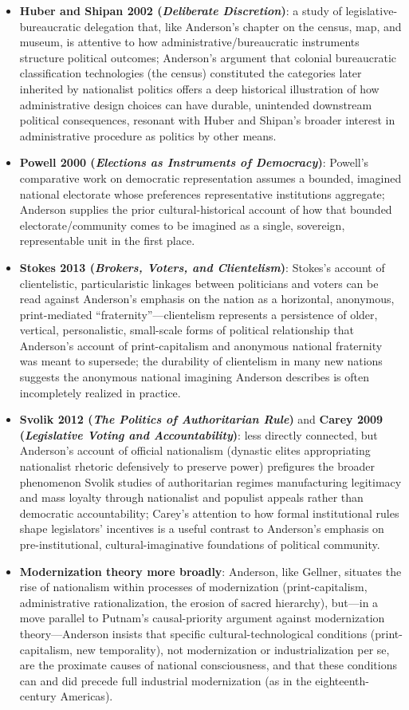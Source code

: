 \documentclass[12pt]{article}
\begin{document}
\begin{itemize}[leftmargin=*, itemsep=4pt]
    \item \textbf{Huber and Shipan 2002 (\textit{Deliberate Discretion})}: a study of legislative-bureaucratic delegation that, like Anderson's chapter on the census, map, and museum, is attentive to how administrative/bureaucratic instruments structure political outcomes; Anderson's argument that colonial bureaucratic classification technologies (the census) constituted the categories later inherited by nationalist politics offers a deep historical illustration of how administrative design choices can have durable, unintended downstream political consequences, resonant with Huber and Shipan's broader interest in administrative procedure as politics by other means.
    \item \textbf{Powell 2000 (\textit{Elections as Instruments of Democracy})}: Powell's comparative work on democratic representation assumes a bounded, imagined national electorate whose preferences representative institutions aggregate; Anderson supplies the prior cultural-historical account of how that bounded electorate/community comes to be imagined as a single, sovereign, representable unit in the first place.
    \item \textbf{Stokes 2013 (\textit{Brokers, Voters, and Clientelism})}: Stokes's account of clientelistic, particularistic linkages between politicians and voters can be read against Anderson's emphasis on the nation as a horizontal, anonymous, print-mediated ``fraternity''---clientelism represents a persistence of older, vertical, personalistic, small-scale forms of political relationship that Anderson's account of print-capitalism and anonymous national fraternity was meant to supersede; the durability of clientelism in many new nations suggests the anonymous national imagining Anderson describes is often incompletely realized in practice.
    \item \textbf{Svolik 2012 (\textit{The Politics of Authoritarian Rule})} and \textbf{Carey 2009 (\textit{Legislative Voting and Accountability})}: less directly connected, but Anderson's account of official nationalism (dynastic elites appropriating nationalist rhetoric defensively to preserve power) prefigures the broader phenomenon Svolik studies of authoritarian regimes manufacturing legitimacy and mass loyalty through nationalist and populist appeals rather than democratic accountability; Carey's attention to how formal institutional rules shape legislators' incentives is a useful contrast to Anderson's emphasis on pre-institutional, cultural-imaginative foundations of political community.
    \item \textbf{Modernization theory more broadly}: Anderson, like Gellner, situates the rise of nationalism within processes of modernization (print-capitalism, administrative rationalization, the erosion of sacred hierarchy), but---in a move parallel to Putnam's causal-priority argument against modernization theory---Anderson insists that specific cultural-technological conditions (print-capitalism, new temporality), not modernization or industrialization per se, are the proximate causes of national consciousness, and that these conditions can and did precede full industrial modernization (as in the eighteenth-century Americas).
\end{itemize}
\end{document}
